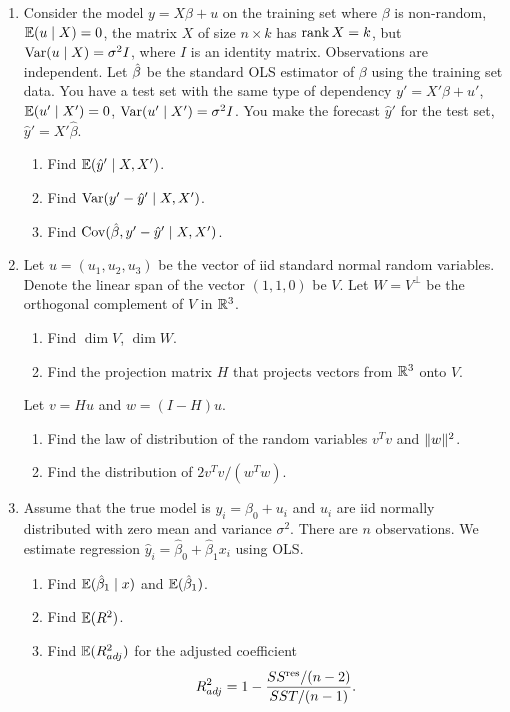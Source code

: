 \begin{enumerate}
    \item Consider the model $y = X\beta + u$ on the training set where $\beta$ is non-random,
    $\operatorname{\mathbb{E}}(u \mid X) = 0$, the matrix $X$ of size $n\times k$ has $\operatorname{rank} X = k$, 
    but $\operatorname{Var}(u \mid X) = \sigma^2 I$, where $I$ is an identity matrix. 
    Observations are independent. 
    Let $\hat{\beta}$ be the standard OLS estimator of $\beta$ using the training set data. 
    You have a test set with the same type of dependency $y' = X' \beta + u'$,
    $\operatorname{\mathbb{E}}(u' \mid X') = 0$, $\operatorname{Var}(u' \mid X') = \sigma^2 I$.
    You make the forecast $\hat y'$ for the test set, $\hat y' = X' \hat\beta$.

    \begin{enumerate}
        \item Find $\operatorname{\mathbb{E}}(\hat y' \mid X, X')$.
        \item Find $\operatorname{Var}(y' - \hat y' \mid X, X')$.
        \item Find $\operatorname{Cov}(\hat{\beta}, y' - \hat y' \mid X, X')$.
    \end{enumerate}

    \item Let $u = (u_1, u_2, u_3)$ be the vector of iid standard normal random variables. 
    Denote the linear span of the vector $(1, 1, 0)$ be $V$.
    Let $W = V^{\perp}$ be the orthogonal complement of $V$ in $\mathbb R^3$. 

    \begin{enumerate}
        \item Find $\dim V$, $\dim W$.
        \item Find the projection matrix $H$ that projects vectors from $\mathbb R^3$ onto $V$.
    \end{enumerate}
    Let $v = Hu$ and $w = (I - H)u$.
    \begin{enumerate}[resume]
        \item Find the law of distribution of the random variables $v^T v$ and $\lVert w\rVert^2$.
        \item Find the distribution of $2v^Tv/(w^Tw)$.
    \end{enumerate}

    \item Assume that the true model is $y_i = \beta_0 +  u_i$ and $u_i$ are iid normally distributed with zero mean and variance $\sigma^2$.
    There are $n$ observations.
    We estimate regression $\hat y_i = \hat \beta_0 + \hat\beta_1 x_i$ using OLS.

    \begin{enumerate}
        \item Find $\operatorname{\mathbb{E}}(\hat \beta_1 \mid x)$  and $\operatorname{\mathbb{E}}(\hat\beta_1)$.
        \item Find $\operatorname{\mathbb{E}}(R^2)$.
        \item Find $\operatorname{\mathbb{E}}(R^2_{adj})$ for the adjusted coefficient 
        \[
            R^2_{adj} = 1 - \frac{SS^{\text{res}} / (n - 2)}{SST / (n - 1)}.
        \]
        
    \end{enumerate}

\end{enumerate}



